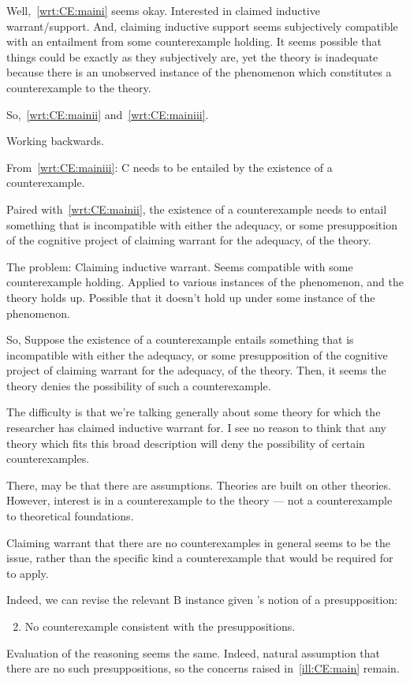 \begin{note}
  Well,~\ref{wrt:CE:maini} seems okay.
  Interested in claimed inductive warrant/support.
  And, claiming inductive support seems subjectively compatible with an entailment from some counterexample holding.
  It seems possible that things could be exactly as they subjectively are, yet the theory is inadequate because there is an unobserved instance of the phenomenon which constitutes a counterexample to the theory.

  So,~\ref{wrt:CE:mainii} and~\ref{wrt:CE:mainiii}.

  Working backwards.

  From~\ref{wrt:CE:mainiii}:
  C needs to be entailed by the existence of a counterexample.

  Paired with~\ref{wrt:CE:mainii}, the existence of a counterexample needs to entail something that is incompatible with either the adequacy, or some presupposition of the cognitive project of claiming warrant for the adequacy, of the theory.

  The problem:
  Claiming inductive warrant.
  Seems compatible with some counterexample holding.
  Applied to various instances of the phenomenon, and the theory holds up.
  Possible that it doesn't hold up under some instance of the phenomenon.

  So,
  Suppose the existence of a counterexample entails something that is incompatible with either the adequacy, or some presupposition of the cognitive project of claiming warrant for the adequacy, of the theory.
  Then, it seems the theory denies the possibility of such a counterexample.

  The difficulty is that we're talking generally about some theory for which the researcher has claimed inductive warrant for.
  I see no reason to think that any theory which fits this broad description will deny the possibility of certain counterexamples.

  There, may be that there are assumptions.
  Theories are built on other theories.
  However, interest is in a counterexample to the theory --- not a counterexample to theoretical foundations.

  Claiming warrant that there are no counterexamples in general seems to be the issue, rather than the specific kind a counterexample that would be required for \wrt{} to apply.

  Indeed, we can revise the relevant B instance given \citeauthor{Wright:2011wn}'s notion of a presupposition:
  \begin{enumerate}[label=\Alph*\('\)., ref=(\Alph*\('\))]
    \setcounter{enumi}{1}
  \item No counterexample consistent with the presuppositions.
  \end{enumerate}

  Evaluation of the reasoning seems the same.
  Indeed, natural assumption that there are no such presuppositions, so the concerns raised in~\autoref{ill:CE:main} remain.
\end{note}

